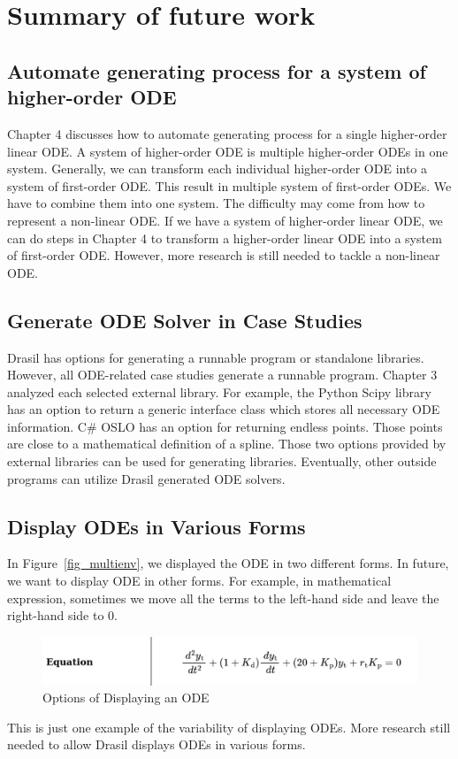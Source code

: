 \chapter{Summary of future work}

\section{Automate generating process for a system of higher-order ODE}
Chapter 4 discusses how to automate generating process for a single higher-order linear ODE. A system of higher-order ODE is multiple higher-order ODEs in one system. Generally, we can transform each individual higher-order ODE into a system of first-order ODE. This result in multiple system of first-order ODEs. We have to combine them into one system. The difficulty may come from how to represent a non-linear ODE. If we have a system of higher-order linear ODE, we can do steps in Chapter 4 to transform a higher-order linear ODE into a system of first-order ODE. However, more research is still needed to tackle a non-linear ODE.

\section{Generate ODE Solver in Case Studies}
Drasil has options for generating a runnable program or standalone libraries. However, all ODE-related case studies generate a runnable program. Chapter 3 analyzed each selected external library. For example, the Python Scipy library has an option to return a generic interface class which stores all necessary ODE information. C\# OSLO has an option for returning endless points. Those points are close to a mathematical definition of a spline. Those two options provided by external libraries can be used for generating libraries. Eventually, other outside programs can utilize Drasil generated ODE solvers.

\section{Display ODEs in Various Forms}
In Figure~\ref{fig_multienv}, we displayed the ODE in two different forms. In future, we want to display ODE in other forms. For example, in mathematical expression, sometimes we move all the terms to the left-hand side and leave the right-hand side to 0.
\begin{figure}[ht]
\centering	
\includegraphics[width=1\textwidth]{figures/ODEVariousForm.png}
\caption{Options of Displaying an ODE}
\label{fig_odevariousform}
\end{figure}
This is just one example of the variability of displaying ODEs. More research still needed to allow Drasil displays ODEs in various forms.

